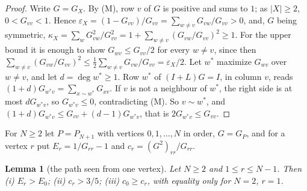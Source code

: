 \documentclass[11pt]{amsart}
\newtheorem{lemma}[theorem]{Lemma}
\theoremstyle{definition}
\theoremstyle{remark}
\begin{document}
\begin{proof}
Write $G=G_X$. By (M), row $v$ of $G$ is positive and sums to $1$; as
$|X|\ge2$, $0<G_{vv}<1$. Hence
$\varepsilon_X=(1-G_{vv})/G_{vv}=\sum_{w\ne v}G_{vw}/G_{vv}>0$, and, $G$ being
symmetric, $\kappa_X=\sum_wG_{vw}^2/G_{vv}^2=1+\sum_{w\ne v}(G_{vw}/G_{vv})^2\ge1$.
For the upper bound it is enough to show $G_{wv}\le G_{vv}/2$ for every
$w\ne v$, since then
$\sum_{w\ne v}(G_{vw}/G_{vv})^2\le\frac12\sum_{w\ne v}G_{vw}/G_{vv}=\varepsilon_X/2$.
Let $w^*$ maximize $G_{wv}$ over $w\ne v$, and let $d=\deg w^*\ge1$. Row
$w^*$ of $(I+L)G=I$, in column $v$, reads $(1+d)G_{w^*v}=\sum_{x\sim w^*}G_{xv}$.
If $v$ is not a neighbour of $w^*$, the right side is at most $dG_{w^*v}$,
so $G_{w^*v}\le0$, contradicting (M). So $v\sim w^*$, and
$(1+d)G_{w^*v}\le G_{vv}+(d-1)G_{w^*v}$, that is $2G_{w^*v}\le G_{vv}$.
\end{proof}

For $N\ge2$ let $P=P_{N+1}$ with vertices $0,1,\dots,N$ in order, $G=G_P$,
and for a vertex $r$ put $E_r=1/G_{rr}-1$ and $c_r=(G^2)_{rr}/G_{rr}$.

\begin{lemma}[the path seen from one vertex]\label{lem:S44}
Let $N\ge2$ and $1\le r\le N-1$. Then (i) $E_r>E_0$; (ii) $c_r>3/5$;
(iii) $c_0\ge c_r$, with equality only for $N=2$, $r=1$.
\end{lemma}
\end{document}
